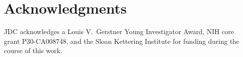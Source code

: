 \documentclass[aps,pre,twocolumn,nofootinbib,superscriptaddress,linenumbers,11point]{revtex4-1}
\begin{document}

\section*{Acknowledgments}

JDC acknowledges a Louis V.~Gerstner Young Investigator Award, NIH core grant P30-CA008748, and the Sloan Kettering Institute for funding during the course of this work.


 

\end{document}
